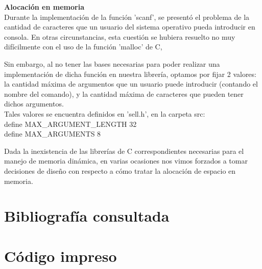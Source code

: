 \documentclass[12pt, a4paper, spanish]{report}
\begin{document}
\textbf{Alocaci\'on en memoria}\\
\indent Durante la implementaci\'on de la funci\'on 'scanf', se present\'o el problema de la cantidad de caracteres que un usuario
del sistema operativo pueda introducir en consola. En otras circunstancias, esta cuesti\'on se hubiera resuelto no muy dif\'icilmente
con el uso de la funci\'on 'malloc' de C,\par
\indent Sin embargo, al no tener las bases necesarias para poder realizar una implementaci\'on de dicha funci\'on en nuestra
librer\'ia, optamos por fijar 2 valores: la cantidad m\'axima de argumentos que un usuario puede introducir (contando el nombre
del comando), y la cantidad m\'axima de caracteres que pueden tener dichos argumentos.\\
\indent Tales valores se encuentra definidos en 'sell.h', en la carpeta src:\\
\indent  \indent define MAX\_ARGUMENT\_LENGTH 32\\
\indent  \indent define MAX\_ARGUMENTS 8


Dada la inexistencia de las librer\'ias de C correspondientes necesarias para el manejo de memoria din\'amica, en varias
ocasiones nos vimos forzados a tomar decisiones de dise\~no con respecto a c\'omo tratar la alocaci\'on de espacio en memoria.\\
\chapter*{Bibliograf\'ia consultada}
\par
\chapter*{C\'odigo impreso}
\par
\end{document}
